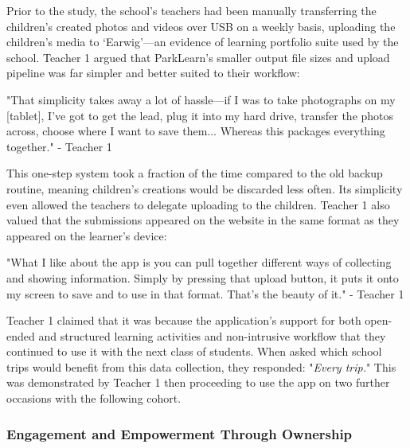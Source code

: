Prior to the study, the school’s teachers had been manually transferring the children’s created photos and videos over USB on a weekly basis, uploading the children’s media to `Earwig'---an evidence of learning portfolio suite used by the school. Teacher 1 argued that ParkLearn’s smaller output file sizes and upload pipeline was far simpler and better suited to their workflow:

\begin{displayquote}
"That simplicity takes away a lot of hassle---if I was to take photographs on my [tablet], I've got to get the lead, plug it into my hard drive, transfer the photos across, choose where I want to save them... Whereas this packages everything together."  - Teacher 1
\end{displayquote}

This one-step system took a fraction of the time compared to the old backup routine, meaning children’s creations would be discarded less often. Its simplicity even allowed the teachers to delegate uploading to the children. Teacher 1 also valued that the submissions appeared on the website in the same format as they appeared on the learner’s device: 

\begin{displayquote}
"What I like about the app is you can pull together different ways of collecting and showing information. Simply by pressing that upload button, it puts it onto my screen to save and to use in that format. That’s the beauty of it."  - Teacher 1
\end{displayquote}

Teacher 1 claimed that it was because the application's support for both open-ended and structured learning activities and non-intrusive workflow that they continued to use it with the next class of students. When asked which school trips would benefit from this data collection, they responded: "\textit{Every trip.}" This was demonstrated by Teacher 1 then proceeding to use the app on two further occasions with the following cohort.

\subsubsection{Engagement and Empowerment Through Ownership}

